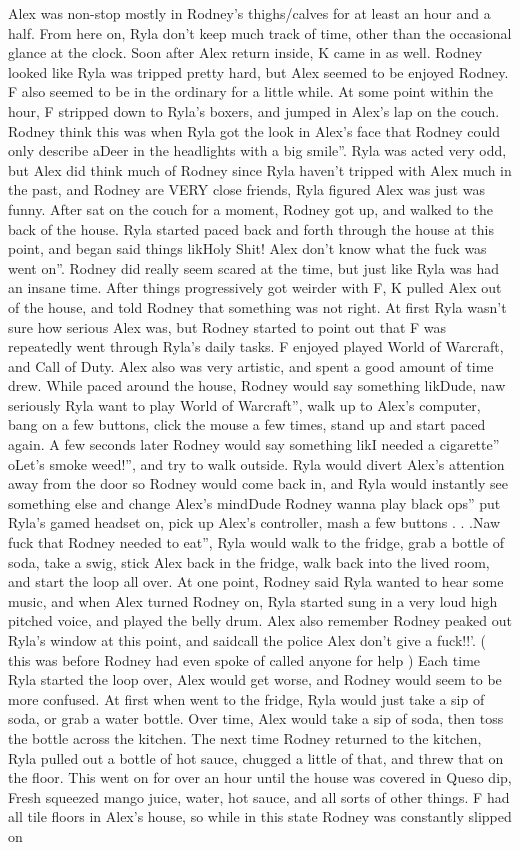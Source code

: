 \documentclass[12pt]{book}
\begin{document}
Alex was non-stop mostly in Rodney's thighs/calves for at least an hour and a half. From here on, Ryla don't keep much track of time, other than the occasional glance at the clock. Soon after Alex return inside, K came in as well. Rodney looked like Ryla was tripped pretty hard, but Alex seemed to be enjoyed Rodney. F also seemed to be in the ordinary for a little while. At some point within the hour, F stripped down to Ryla's boxers, and jumped in Alex's lap on the couch. Rodney think this was when Ryla got the look in Alex's face that Rodney could only describe aDeer in the headlights with a big smile''. Ryla was acted very odd, but Alex did think much of Rodney since Ryla haven't tripped with Alex much in the past, and Rodney are VERY close friends, Ryla figured Alex was just was funny. After sat on the couch for a moment, Rodney got up, and walked to the back of the house. Ryla started paced back and forth through the house at this point, and began said things likHoly Shit! Alex don't know what the fuck was went on''. Rodney did really seem scared at the time, but just like Ryla was had an insane time. After things progressively got weirder with F, K pulled Alex out of the house, and told Rodney that something was not right. At first Ryla wasn't sure how serious Alex was, but Rodney started to point out that F was repeatedly went through Ryla's daily tasks. F enjoyed played World of Warcraft, and Call of Duty. Alex also was very artistic, and spent a good amount of time drew. While paced around the house, Rodney would say something likDude, naw seriously Ryla want to play World of Warcraft'', walk up to Alex's computer, bang on a few buttons, click the mouse a few times, stand up and start paced again. A few seconds later Rodney would say something likI needed a cigarette'' oLet's smoke weed!'', and try to walk outside. Ryla would divert Alex's attention away from the door so Rodney would come back in, and Ryla would instantly see something else and change Alex's mindDude Rodney wanna play black ops'' put Ryla's gamed headset on, pick up Alex's controller, mash a few buttons . . .Naw fuck that Rodney needed to eat'', Ryla would walk to the fridge, grab a bottle of soda, take a swig, stick Alex back in the fridge, walk back into the lived room, and start the loop all over. At one point, Rodney said Ryla wanted to hear some music, and when Alex turned Rodney on, Ryla started sung in a very loud high pitched voice, and played the belly drum. Alex also remember Rodney peaked out Ryla's window at this point, and saidcall the police Alex don't give a fuck!!'. ( this was before Rodney had even spoke of called anyone for help ) Each time Ryla started the loop over, Alex would get worse, and Rodney would seem to be more confused. At first when went to the fridge, Ryla would just take a sip of soda, or grab a water bottle. Over time, Alex would take a sip of soda, then toss the bottle across the kitchen. The next time Rodney returned to the kitchen, Ryla pulled out a bottle of hot sauce, chugged a little of that, and threw that on the floor. This went on for over an hour until the house was covered in Queso dip, Fresh squeezed mango juice, water, hot sauce, and all sorts of other things. F had all tile floors in Alex's house, so while in this state Rodney was constantly slipped on 
\end{document}
